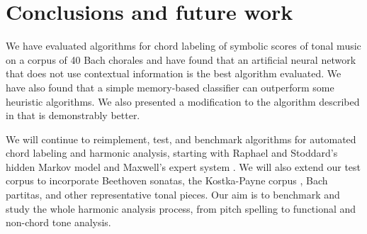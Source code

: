 \documentclass{article}
\begin{document}
\section{Conclusions and future work}
\label{sec:conclusions}

We have evaluated algorithms for chord labeling of symbolic scores of
tonal music on a corpus of 40 Bach chorales and have found that an
artificial neural network that does not use contextual information is
the best algorithm evaluated. We have also found that a simple
memory-based classifier can outperform some heuristic algorithms. We
also presented a modification to the algorithm described in
\cite{barthelemy.ea01:figured} that is demonstrably better.

We will continue to reimplement, test, and benchmark algorithms for
automated chord labeling and harmonic analysis, starting with Raphael
and Stoddard's hidden Markov model \cite{raphael.ea03:harmonic} and
Maxwell's expert system \cite{maxwell92:expert}.  We will also extend
our test corpus to incorporate Beethoven sonatas, the Kostka-Payne
corpus \cite{temperley04:bayesian}, Bach partitas, and other
representative tonal pieces. Our aim is to benchmark and study the
whole harmonic analysis process, from pitch spelling to functional and
non-chord tone analysis.



\end{document}
